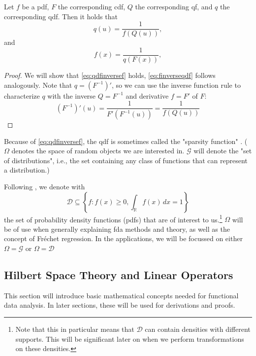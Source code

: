 \begin{lemma}
\label{lemma:f eq inverse qdf}
    Let \(f\) be a pdf, \(F\) the corresponding cdf, \(Q\) the corresponding qf, and
    \(q\) the corresponding qdf. Then it holds that
    \begin{equation}
    \label{eq:qdfinversef}
        {q}(u) = \frac{1}{{f}({Q}(u))},
    \end{equation}
    and
    \begin{equation}
    \label{eq:finverseqdf}
        {f}(x) = \frac{1}{{q}({F}(x))},
    \end{equation}
\end{lemma}
\begin{proof}
    We will show that \eqref{eq:qdfinversef} holds, \eqref{eq:finverseqdf} follows
    analogously. Note that \( q = (F^{-1})' \), so we can use the inverse function
    rule to characterize \(q \) with the inverse $Q = F^{-1}$ and derivative $f = F'$
    of \( F \):
    \begin{equation}
    \label{eq:proof_qdfinversef}
        (F^{-1})'(u) = \frac{1}{{F'}({F^{-1}}(u))} = \frac{1}{{f}({Q}(u))}
    \end{equation}
\end{proof}

Because of \eqref{eq:qdfinversef}, the qdf is sometimes called the "sparsity function"
\parencite[cf.][]{Tukey1965}.
($\Omega$ denotes the space of random objects
we are interested in. $\mathcal{G}$ will denote the "set of distributions", i.e., the set containing
any class of functions that can represent a distribution.)

Following \textcite{PetersenZhangKokoszka2022}, we denote with
\begin{equation}
\label{eq:density_set}
    \mathcal{D} \subseteq \left\{ f : f(x) \geq 0, \int_{\mathbb{R}} f(x) \, dx = 1 \right\}
\end{equation}
the set of probability density functions (pdfs) that are of interest to us.\footnote{Note that
this in particular means that $\mathcal{D}$ can contain densities with different supports.
This will be significant later on when we perform transformations on these densities.}
$\Omega$ will be of use when generally explaining fda methods and theory, as well as
the concept of Fréchet regression. In the applications, we will be focussed on either
$\Omega = \mathcal{G}$ or $\Omega = \mathcal{D}$

\subsection{Hilbert Space Theory and Linear Operators}
\label{sec:hilbert spaces}
This section will introduce basic mathematical concepts needed for functional data
analysis. In later sections, these will be used for derivations and proofs.

